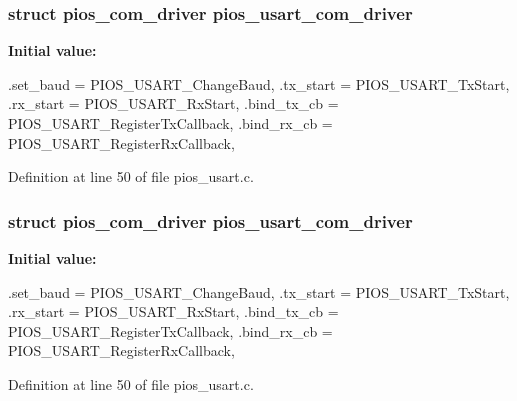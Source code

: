 \hypertarget{group___p_i_o_s___u_s_a_r_t_gae7414398fe53c376d74ea4c0eecb0670}{
\subsubsection[{pios\-\_\-usart\-\_\-com\-\_\-driver}]{\setlength{\rightskip}{0pt plus 5cm}struct {\bf pios\-\_\-com\-\_\-driver} {\bf pios\-\_\-usart\-\_\-com\-\_\-driver}}}\label{group___p_i_o_s___u_s_a_r_t_gae7414398fe53c376d74ea4c0eecb0670}
{\bfseries \-Initial value\-:}
\begin{DoxyCode}
 {
        .set_baud   = PIOS_USART_ChangeBaud,
        .tx_start   = PIOS_USART_TxStart,
        .rx_start   = PIOS_USART_RxStart,
        .bind_tx_cb = PIOS_USART_RegisterTxCallback,
        .bind_rx_cb = PIOS_USART_RegisterRxCallback,
}
\end{DoxyCode}


\-Definition at line 50 of file pios\-\_\-usart.\-c.

\hypertarget{group___p_i_o_s___u_s_a_r_t_gae7414398fe53c376d74ea4c0eecb0670}{
\subsubsection[{pios\-\_\-usart\-\_\-com\-\_\-driver}]{\setlength{\rightskip}{0pt plus 5cm}struct {\bf pios\-\_\-com\-\_\-driver} {\bf pios\-\_\-usart\-\_\-com\-\_\-driver}}}\label{group___p_i_o_s___u_s_a_r_t_gae7414398fe53c376d74ea4c0eecb0670}
{\bfseries \-Initial value\-:}
\begin{DoxyCode}
 {
        .set_baud   = PIOS_USART_ChangeBaud,
        .tx_start   = PIOS_USART_TxStart,
        .rx_start   = PIOS_USART_RxStart,
        .bind_tx_cb = PIOS_USART_RegisterTxCallback,
        .bind_rx_cb = PIOS_USART_RegisterRxCallback,
}
\end{DoxyCode}


\-Definition at line 50 of file pios\-\_\-usart.\-c.

